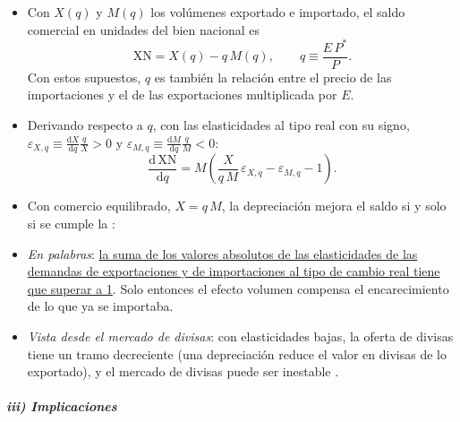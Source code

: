 \documentclass[11pt]{article}
\begin{document}
\begin{itemize}
\item Con $X(q)$ y $M(q)$ los volúmenes exportado e importado, el saldo comercial en unidades del bien nacional es
  \begin{equation}\label{eq:saldo-comercial}
  \mathrm{XN}=X(q)-q\,M(q),\qquad q\equiv\frac{E\,P^*}{P}.
  \end{equation}
  Con estos supuestos, $q$ es también la relación entre el precio de las importaciones y el de las exportaciones multiplicada por $E$.
\item Derivando respecto a $q$, con las elasticidades al tipo real con su signo, $\varepsilon_{X,q}\equiv\frac{\mathrm dX}{\mathrm dq}\frac{q}{X}>0$ y $\varepsilon_{M,q}\equiv\frac{\mathrm dM}{\mathrm dq}\frac{q}{M}<0$:
  \begin{equation}\label{eq:ml-derivada}
  \frac{\mathrm d\,\mathrm{XN}}{\mathrm dq}=M\left(\frac{X}{q\,M}\,\varepsilon_{X,q}-\varepsilon_{M,q}-1\right).
  \end{equation}
\item Con comercio equilibrado, $X=q\,M$, la depreciación mejora el saldo si y solo si se cumple la :
\item \emph{En palabras}: \uline{la suma de los valores absolutos de las elasticidades de las demandas de exportaciones y de importaciones al tipo de cambio real tiene que superar a 1}. Solo entonces el efecto volumen compensa el encarecimiento de lo que ya se importaba.
\item \emph{Vista desde el mercado de divisas}: con elasticidades bajas, la oferta de divisas tiene un tramo decreciente (una depreciación reduce el valor en divisas de lo exportado), y el mercado de divisas puede ser inestable .
\end{itemize}

\subparagraph{iii) Implicaciones}
\end{document}
